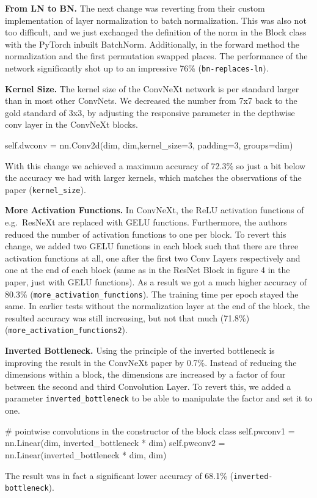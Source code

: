 \documentclass{article}
\begin{document}
\textbf{From LN to BN.} %
The next change was reverting from their custom implementation of layer normalization to batch normalization.
This was also not too difficult, and we just exchanged the definition of the norm in the Block class with the PyTorch inbuilt BatchNorm.
Additionally, in the forward method the normalization and the first permutation swapped places.
The performance of the network significantly shot up to an impressive 76\% (\texttt{bn-replaces-ln}).

\textbf{Kernel Size.} %
The kernel size of the ConvNeXt network is per standard larger than in most other ConvNets.
We decreased the number from 7x7 back to the gold standard of 3x3, by adjusting the responsive parameter in the depthwise conv layer in the ConvNeXt blocks.
\begin{python}
    self.dwconv = nn.Conv2d(dim, dim,kernel_size=3, padding=3, groups=dim)
\end{python}
With this change we achieved a maximum accuracy of 72.3\% so just a bit below the accuracy we had with larger kernels, which matches the observations of the paper (\texttt{kernel\_size}).

\textbf{More Activation Functions.} %
In ConvNeXt, the ReLU activation functions of e.g.\ ResNeXt are replaced with GELU functions.
Furthermore, the authors reduced the number of activation functions to one per block.
To revert this change, we added two GELU functions in each block such that there are three activation functions at all, one after the first two Conv Layers respectively and one at the end of each block (same as in the ResNet Block in figure 4 in the paper, just with GELU functions).
As a result we got a much higher accuracy of 80.3\% (\texttt{more\_activation\_functions}).
The training time per epoch stayed the same.
In earlier tests without the normalization layer at the end of the block, the resulted accuracy was still increasing, but not that much (71.8\%) (\texttt{more\_activation\_functions2}).

\textbf{Inverted Bottleneck.} %
Using the principle of the inverted bottleneck is improving the result in the ConvNeXt paper by 0.7\%.
Instead of reducing the dimensions within a block, the dimensions are increased by a factor of four between the second and third Convolution Layer.
To revert this, we added a parameter \texttt{inverted\_bottleneck}
to be able to manipulate the factor and set it to one.
\begin{python}
    # pointwise convolutions in the constructor of the block class
    self.pwconv1 = nn.Linear(dim, inverted_bottleneck * dim)
    self.pwconv2 = nn.Linear(inverted_bottleneck * dim, dim)
\end{python}
The result was in fact a significant lower accuracy of 68.1\% (\texttt{inverted-bottleneck}).
\end{document}
